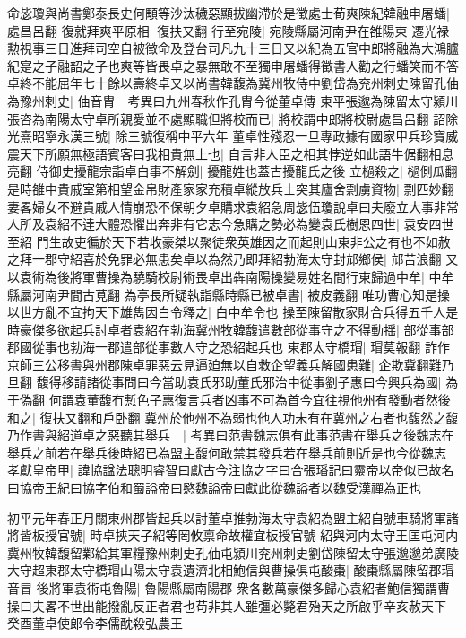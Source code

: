 命毖瓊與尚書鄭泰長史何顒等沙汰穢惡顯拔幽滯於是徵處士荀爽陳紀韓融申屠蟠|{
	處昌呂翻}
復就拜爽平原相|{
	復扶又翻}
行至宛陵|{
	宛陵縣屬河南尹在雒陽東}
遷光禄勲視事三日進拜司空自被徵命及登台司凡九十三日又以紀為五官中郎將融為大鴻臚紀寔之子融韶之子也爽等皆畏卓之暴無敢不至獨申屠蟠得徵書人勸之行蟠笑而不答卓終不能屈年七十餘以壽終卓又以尚書韓馥為冀州牧侍中劉岱為兖州刺史陳留孔伷為豫州刺史|{
	伷音胄　考異曰九州春秋作孔胄今從董卓傳}
東平張邈為陳留太守潁川張咨為南陽太守卓所親愛並不處顯職但將校而已|{
	將校謂中郎將校尉處昌呂翻}
詔除光熹昭寧永漢三號|{
	除三號復稱中平六年}
董卓性殘忍一旦專政據有國家甲兵珍寶威震天下所願無極語賓客曰我相貴無上也|{
	自言非人臣之相其悖逆如此語牛倨翻相息亮翻}
侍御史擾龍宗詣卓白事不解劍|{
	擾龍姓也蓋古擾龍氏之後}
立檛殺之|{
	檛側瓜翻}
是時雒中貴戚室第相望金帛財產家家充積卓縱放兵士突其廬舍剽虜資物|{
	剽匹妙翻}
妻畧婦女不避貴戚人情崩恐不保朝夕卓購求袁紹急周毖伍瓊說卓曰夫廢立大事非常人所及袁紹不逹大體恐懼出奔非有它志今急購之勢必為變袁氏樹恩四世|{
	袁安四世至紹}
門生故吏徧於天下若收豪桀以聚徒衆英雄因之而起則山東非公之有也不如赦之拜一郡守紹喜於免罪必無患矣卓以為然乃即拜紹勃海太守封邟鄉侯|{
	邟苦浪翻}
又以袁術為後將軍曹操為驍騎校尉術畏卓出犇南陽操變易姓名間行東歸過中牟|{
	中牟縣屬河南尹間古莧翻}
為亭長所疑執詣縣時縣已被卓書|{
	被皮義翻}
唯功曹心知是操以世方亂不宜拘天下雄雋因白令釋之|{
	白中牟令也}
操至陳留散家財合兵得五千人是時豪傑多欲起兵討卓者袁紹在勃海冀州牧韓馥遣數部從事守之不得動揺|{
	部從事部郡國從事也勃海一郡遣部從事數人守之恐紹起兵也}
東郡太守橋瑁|{
	瑁莫報翻}
詐作京師三公移書與州郡陳卓罪惡云見逼廹無以自救企望義兵解國患難|{
	企欺冀翻難乃旦翻}
馥得移請諸從事問曰今當助袁氏邪助董氏邪治中從事劉子惠曰今興兵為國|{
	為于偽翻}
何謂袁董馥冇慙色子惠復言兵者凶事不可為首今宜往視他州有發動者然後和之|{
	復扶又翻和戶卧翻}
冀州於他州不為弱也他人功未有在冀州之右者也馥然之馥乃作書與紹道卓之惡聽其舉兵　|{
	考異曰范書魏志俱有此事范書在舉兵之後魏志在舉兵之前若在舉兵後時紹已為盟主馥何敢禁其發兵若在舉兵前則近是也今從魏志}
孝獻皇帝甲|{
	諱協諡法聰明睿智曰獻古今注協之字曰合張璠記曰靈帝以帝似已故名曰協帝王紀曰協字伯和蜀謚帝曰愍魏謚帝曰獻此從魏謚者以魏受漢禪為正也}


初平元年春正月關東州郡皆起兵以討董卓推勃海太守袁紹為盟主紹自號車騎將軍諸將皆板授官號|{
	時卓挾天子紹等罔攸禀命故權宜板授官號}
紹與河内太守王匡屯河内冀州牧韓馥留鄴給其軍糧豫州刺史孔伷屯潁川兖州刺史劉岱陳留太守張邈邈弟廣陵大守超東郡太守橋瑁山陽太守袁遺濟北相鮑信與曹操俱屯酸棗|{
	酸棗縣屬陳留郡瑁音冒}
後將軍袁術屯魯陽|{
	魯陽縣屬南陽郡}
衆各數萬豪傑多歸心袁紹者鮑信獨謂曹操曰夫畧不世出能撥亂反正者君也苟非其人雖彊必斃君殆天之所啟乎辛亥赦天下　癸酉董卓使郎令李儒酖殺弘農王

